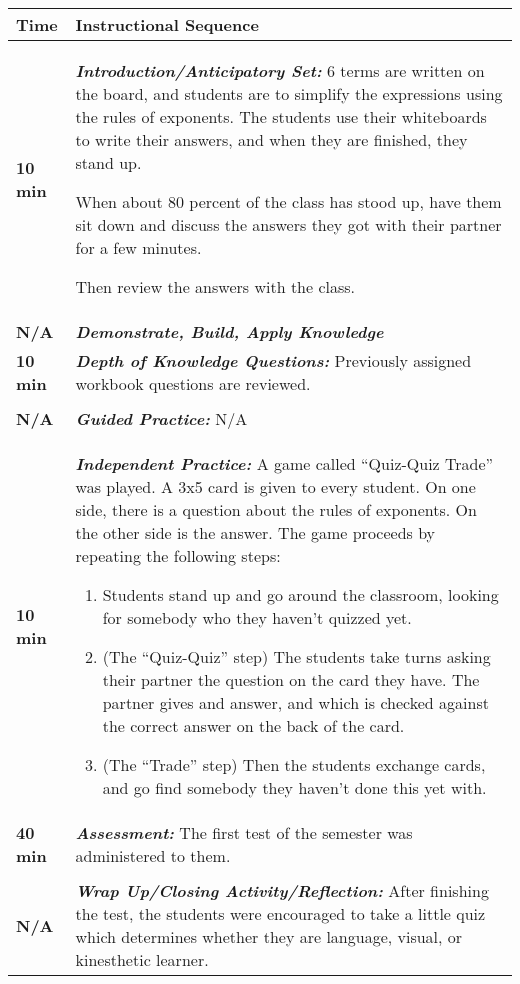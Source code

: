 \pagebreak

\begin{tabularx}{\textwidth}{|p{0.5in}|X|}
  \hline
  \centerline{\textbf{\large Time}} &  \textbf{\large Instructional Sequence } \\
  \hline

  \textbf{10 min} & \textbf{\em Introduction/Anticipatory Set:} 6
  terms are written on the board, and students are to simplify the
  expressions using the rules of exponents.  The students use their
  whiteboards to write their answers, and when they are finished, they
  stand up.
  
  When about 80 percent of the class has stood up, have them sit down
  and discuss the answers they got with their partner for a few
  minutes.

  Then review the answers with the class. \\
  \hline
  
  \textbf{N/A} &  \textbf{\em Demonstrate, Build, Apply Knowledge} \\
  \hline
  \textbf{10 min} &  \textbf{\em Depth of Knowledge Questions:} Previously assigned workbook questions are reviewed.  \\
  \\
  \hline
  \textbf{N/A} &  \textbf{\em Guided Practice:} N/A \\
  \hline
  \textbf{10 min} &  \textbf{\em Independent Practice:} A game called ``Quiz-Quiz Trade'' was played.  A 3x5 card is given to every student.  On one side, there is a question about the rules of exponents.  On the other side is the answer.  The game proceeds by repeating the following steps:
 
  {\begin{enumerate}
    \item Students stand up and go around the classroom, looking for somebody who they haven't quizzed yet.
   \item (The ``Quiz-Quiz'' step) The students take turns asking their
     partner the question on the card they have.  The partner gives and answer, and which is checked against the correct answer on the back of the card.
   \item (The ``Trade'' step)  Then the students exchange cards, and go find somebody they haven't done this yet with.
 \end{enumerate}} \\
 \hline
 
 \textbf{40 min} &  \textbf{\em Assessment:}  The first test of the semester was administered to them. \\
 \\
 \hline
 \textbf{N/A} &  \textbf{\em Wrap Up/Closing Activity/Reflection:} After finishing the test, the students were encouraged to take a little quiz which determines whether they are language, visual, or kinesthetic learner. \\
 \hline
\end{tabularx}

